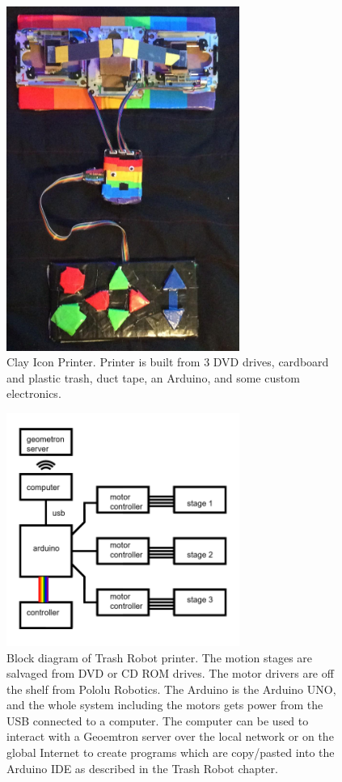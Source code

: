 \begin{figure}
	\centering
	\includegraphics[width=3in]{figures/machines/printerphoto.png}
	\caption[printerphoto]
	{Clay Icon Printer.  Printer is built from 3 DVD drives, cardboard and plastic trash, duct tape, an Arduino, and some custom electronics.}
\end{figure}

\begin{figure}
	\centering
	\includegraphics[width=3in]{figures/machines/printerblockdiagram.png}
	\caption[printerblockdiagram]
	{Block diagram of Trash Robot printer.  The motion stages are salvaged from DVD or CD ROM drives.  The motor drivers are off the shelf from Pololu Robotics.  The Arduino is the Arduino UNO, and the whole system including the motors gets power from the USB connected to a computer.  The computer can be used to interact with a Geoemtron server over the local network or on the global Internet to create programs which are copy/pasted into the Arduino IDE as described in the Trash Robot chapter.}
\end{figure}


